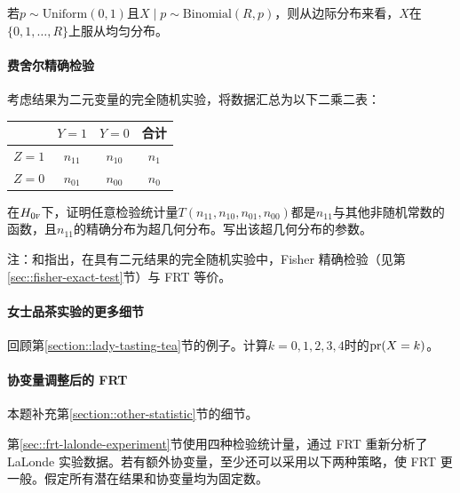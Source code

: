 \begin{lemma}
\label{lemma::uniform}
若$p\sim \text{Uniform}(0,1)$且$X\mid p \sim \text{Binomial}(R, p)$，则从边际分布来看，$X$在$\{ 0,1,\ldots, R  \}$上服从均匀分布。 
\end{lemma}

 


\paragraph{费舍尔精确检验}
\label{hw::frt-fisherexacttest}

考虑结果为二元变量的完全随机实验，将数据汇总为以下二乘二表：
 \begin{center}
\begin{tabular}{lccc}
\hline 
        & $Y =1$ & $Y =0$& 合计\\\hline
$Z =1$ & $n_{11}$ & $n_{10}$ & $n_1$\\ 
$Z =0$ & $n_{01}$ & $n_{00}$ & $n_0$\\ 
\hline 
\end{tabular}
\end{center}
在$H_{0\textsc{f}}$下，证明任意检验统计量$T(n_{11}, n_{10}, n_{01}, n_{00})$都是$n_{11}$与其他非随机常数的函数，且$n_{11}$的精确分布为超几何分布。写出该超几何分布的参数。 

注：\citet{barnard1947significance}和\citet{Ding:2015}指出，在具有二元结果的完全随机实验中，Fisher 精确检验（见第\ref{sec::fisher-exact-test}节）与 FRT 等价。 





\paragraph{女士品茶实验的更多细节}
\label{hw::more-tea}

回顾第\ref{section::lady-tasting-tea}节的例子。计算$k=0,1,2,3,4$时的$\textup{pr}(X=k)$。 


\paragraph{协变量调整后的 FRT}
\label{hw::frt-covariates}


本题补充第\ref{section::other-statistic}节的细节。  


第\ref{sec::frt-lalonde-experiment}节使用四种检验统计量，通过 FRT 重新分析了 LaLonde 实验数据。若有额外协变量，至少还可以采用以下两种策略，使 FRT 更一般。假定所有潜在结果和协变量均为固定数。 

